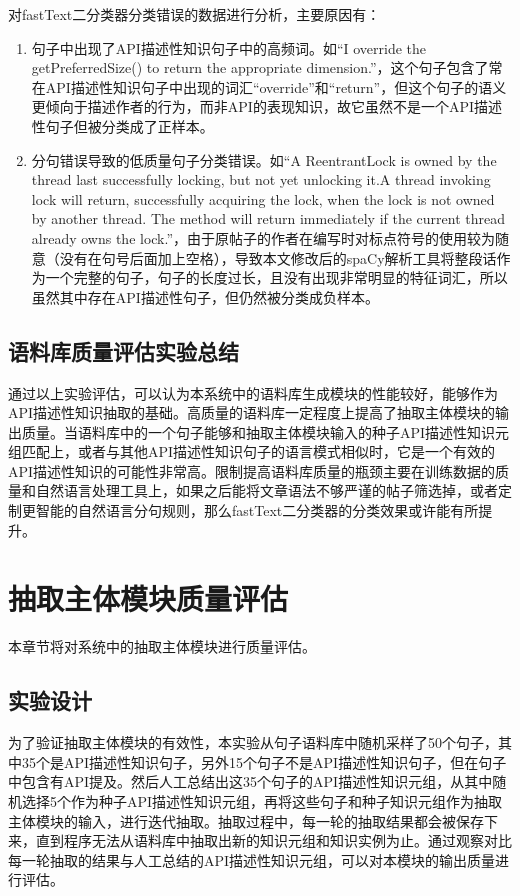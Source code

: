 对fastText二分类器分类错误的数据进行分析，主要原因有：
\begin{enumerate}
    \item 句子中出现了API描述性知识句子中的高频词。如“I override the getPreferredSize() to return the appropriate dimension.”，这个句子包含了常在API描述性知识句子中出现的词汇“override”和“return”，但这个句子的语义更倾向于描述作者的行为，而非API的表现知识，故它虽然不是一个API描述性句子但被分类成了正样本。
    \item 分句错误导致的低质量句子分类错误。如“A ReentrantLock is owned by the thread last successfully locking, but not yet unlocking it.A thread invoking lock will return, successfully acquiring the lock, when the lock is not owned by another thread. The method will return immediately if the current thread already owns the lock.”，由于原帖子的作者在编写时对标点符号的使用较为随意（没有在句号后面加上空格），导致本文修改后的spaCy解析工具将整段话作为一个完整的句子，句子的长度过长，且没有出现非常明显的特征词汇，所以虽然其中存在API描述性句子，但仍然被分类成负样本。
\end{enumerate}

\subsection{语料库质量评估实验总结}
通过以上实验评估，可以认为本系统中的语料库生成模块的性能较好，能够作为API描述性知识抽取的基础。高质量的语料库一定程度上提高了抽取主体模块的输出质量。当语料库中的一个句子能够和抽取主体模块输入的种子API描述性知识元组匹配上，或者与其他API描述性知识句子的语言模式相似时，它是一个有效的API描述性知识的可能性非常高。限制提高语料库质量的瓶颈主要在训练数据的质量和自然语言处理工具上，如果之后能将文章语法不够严谨的帖子筛选掉，或者定制更智能的自然语言分句规则，那么fastText二分类器的分类效果或许能有所提升。

\section{抽取主体模块质量评估}
本章节将对系统中的抽取主体模块进行质量评估。

\subsection{实验设计}
为了验证抽取主体模块的有效性，本实验从句子语料库中随机采样了50个句子，其中35个是API描述性知识句子，另外15个句子不是API描述性知识句子，但在句子中包含有API提及。然后人工总结出这35个句子的API描述性知识元组，从其中随机选择5个作为种子API描述性知识元组，再将这些句子和种子知识元组作为抽取主体模块的输入，进行迭代抽取。抽取过程中，每一轮的抽取结果都会被保存下来，直到程序无法从语料库中抽取出新的知识元组和知识实例为止。通过观察对比每一轮抽取的结果与人工总结的API描述性知识元组，可以对本模块的输出质量进行评估。

